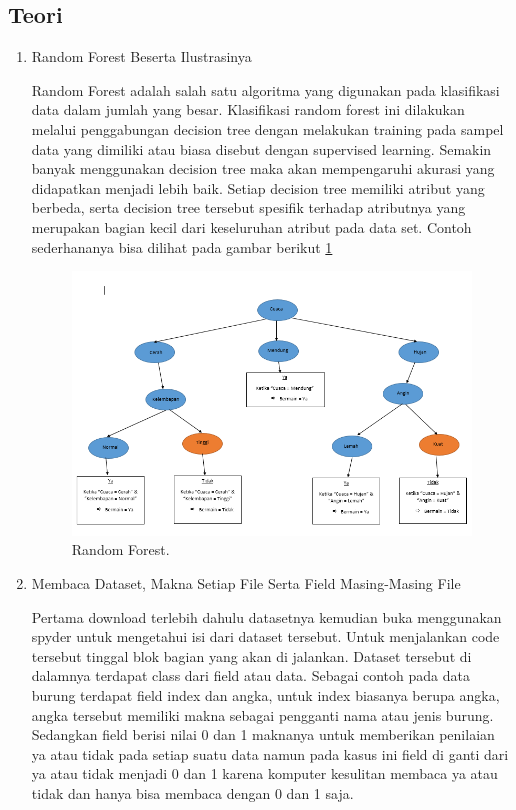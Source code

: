 \subsection{Teori}
\begin{enumerate}
\item Random Forest Beserta Ilustrasinya \par
Random Forest adalah salah satu algoritma yang digunakan pada klasifikasi data dalam jumlah yang besar. Klasifikasi random forest ini dilakukan melalui penggabungan decision tree dengan melakukan training pada sampel data yang dimiliki atau biasa disebut dengan supervised learning. Semakin banyak menggunakan decision tree maka akan mempengaruhi akurasi yang didapatkan menjadi lebih baik. Setiap decision tree memiliki atribut yang berbeda, serta decision tree tersebut spesifik terhadap atributnya yang merupakan bagian kecil dari keseluruhan atribut pada data set. Contoh sederhananya bisa dilihat pada gambar berikut \ref{R1}
		\begin{figure}[ht]
		\centerline{\includegraphics[width=1\textwidth]{figures/im/R1.png}}
		\caption{Random Forest.}
		\label{R1}
		\end{figure}

\item Membaca Dataset, Makna Setiap File Serta Field Masing-Masing File\par
Pertama download terlebih dahulu datasetnya kemudian buka menggunakan spyder untuk mengetahui isi dari dataset tersebut. Untuk menjalankan code tersebut tinggal blok bagian yang akan di jalankan. Dataset tersebut di dalamnya terdapat class dari field atau data. Sebagai contoh pada data burung terdapat field index dan angka, untuk index biasanya berupa angka, angka tersebut memiliki makna sebagai pengganti nama atau jenis burung. Sedangkan field berisi nilai 0 dan 1 maknanya untuk memberikan penilaian ya atau tidak pada setiap suatu data namun pada kasus ini field di ganti dari ya atau tidak menjadi 0 dan 1 karena komputer kesulitan membaca ya atau tidak dan hanya bisa membaca dengan 0 dan 1 saja.


\end{enumerate}
